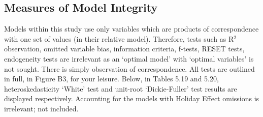 \documentclass[11pt, english]{article}
\begin{document}
	\newpage

	\subsection{Measures of Model Integrity}

	Models within this study use only variables which are products of correspondence with one set of values (in their relative model). Therefore, tests such as R$^2$ observation, omitted variable bias, information criteria, f-tests, RESET tests, endogeneity tests are irrelevant as an `optimal model' with `optimal variables' is not sought. There is simply observation of correspondence. All tests are outlined in full, in Figure B3, for your leisure. Below, in Tables 5.19 and 5.20, heteroskedasticity `White' test and unit-root `Dickie-Fuller' test results are displayed respectively. Accounting for the models with Holiday Effect omissions is irrelevant; not included.
\end{document}
